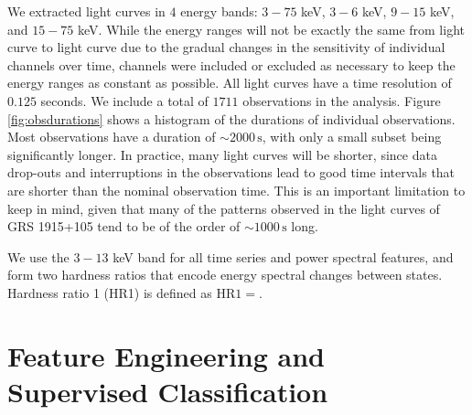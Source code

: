 \documentclass[12pt]{emulateapj}
\begin{document}
We extracted light curves in $4$ energy bands: $3 - 75$ keV, $3 - 6$ keV, $9 - 15$ keV, and $15 - 75$ keV. While the energy ranges will not be exactly the same from light curve to light curve due to the gradual changes in the sensitivity of individual channels over time, channels were included or excluded as necessary to keep the energy ranges as constant as possible. All light curves have a time resolution of $0.125$ seconds. We include a total of $1711$ observations in the analysis. 
Figure \ref{fig:obsdurations} shows a histogram of the durations of individual observations. Most observations have a duration of $\sim\!2000 \,\mathrm{s}$, with only a small subset being significantly longer.
In practice, many light curves will be shorter, since data drop-outs and interruptions in the observations lead to good time intervals that are shorter than the nominal observation time. This is an important limitation to keep in mind, given that many of the patterns observed in the light curves of GRS 1915+105 tend to be of the order of $\sim\! 1000 \,\mathrm{s}$ long.  

%

We use the $3 - 13$ keV band for all time series and power spectral features, and form two hardness ratios that encode energy spectral changes between states. Hardness ratio 1 (HR1) is defined as $\mathrm{HR}1 = $.

\section{Feature Engineering and Supervised Classification}
\end{document}
